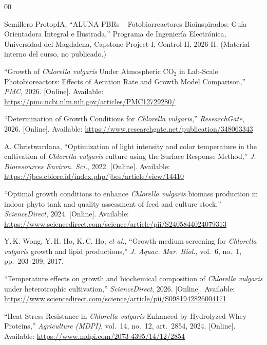 \documentclass[conference]{IEEEtran}
\begin{document}
\begin{thebibliography}{00}

Semillero ProtopIA, ``ALUNA PBRs -- Fotobiorreactores Bioinspirados: Gu\'ia
Orientadora Integral e Ilustrada,'' Programa de Ingenier\'ia
Electr\'onica, Universidad del Magdalena, Capstone Project I, Control II,
2026-II. (Material interno del curso, no publicado.)

``Growth of \textit{Chlorella vulgaris} Under Atmospheric CO$_2$ in
Lab-Scale Photobioreactors: Effects of Aeration Rate and Growth Model
Comparison,'' \textit{PMC}, 2026. [Online]. Available:
\url{https://pmc.ncbi.nlm.nih.gov/articles/PMC12729280/}

``Determination of Growth Conditions for \textit{Chlorella vulgaris},''
\textit{ResearchGate}, 2026. [Online]. Available:
\url{https://www.researchgate.net/publication/348063343}

A. Christwardana, ``Optimization of light intensity and color temperature
in the cultivation of \textit{Chlorella vulgaris} culture using the
Surface Response Method,'' \textit{J. Bioresources Environ. Sci.}, 2022.
[Online]. Available: \url{https://jbes.cbiore.id/index.php/jbes/article/view/14410}

``Optimal growth conditions to enhance \textit{Chlorella vulgaris} biomass
production in indoor phyto tank and quality assessment of feed and
culture stock,'' \textit{ScienceDirect}, 2024. [Online]. Available:
\url{https://www.sciencedirect.com/science/article/pii/S2405844024079313}

Y.\,K. Wong, Y.\,H. Ho, K.\,C. Ho, \textit{et al.}, ``Growth medium
screening for \textit{Chlorella vulgaris} growth and lipid productions,''
\textit{J. Aquac. Mar. Biol.}, vol.~6, no.~1, pp.~203--209, 2017.

``Temperature effects on growth and biochemical composition of
\textit{Chlorella vulgaris} under heterotrophic cultivation,''
\textit{ScienceDirect}, 2026. [Online]. Available:
\url{https://www.sciencedirect.com/science/article/pii/S0981942826004171}

``Heat Stress Resistance in \textit{Chlorella vulgaris} Enhanced by
Hydrolyzed Whey Proteins,'' \textit{Agriculture (MDPI)}, vol.~14, no.~12,
art.~2854, 2024. [Online]. Available: \url{https://www.mdpi.com/2073-4395/14/12/2854}


\end{thebibliography}
\end{document}
